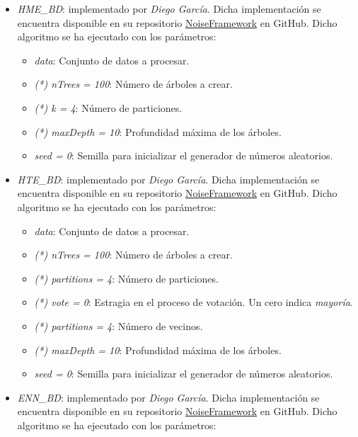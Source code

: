 \documentclass[11pt]{article}
\begin{document}
\begin{itemize}
	\item \textit{HME\_BD}: implementado por \textit{Diego García}. Dicha implementación se encuentra disponible en su repositorio \href{https://github.com/djgarcia/NoiseFramework}{NoiseFramework} en GitHub. Dicho algoritmo se ha ejecutado con los parámetros:
	
	\begin{itemize}
		\item \textit{data}: Conjunto de datos a procesar.
		\item \textit{(*) nTrees = 100}: Número de árboles a crear.
		\item \textit{(*) k = 4}: Número de particiones.
		\item \textit{(*) maxDepth = 10}: Profundidad máxima de los árboles.
		\item \textit{seed = 0}: Semilla para inicializar el generador de números aleatorios.
	\end{itemize}

	\item \textit{HTE\_BD}: implementado por \textit{Diego García}. Dicha implementación se encuentra disponible en su repositorio \href{https://github.com/djgarcia/NoiseFramework}{NoiseFramework} en GitHub. Dicho algoritmo se ha ejecutado con los parámetros:
	
	\begin{itemize}
		\item \textit{data}: Conjunto de datos a procesar.
		\item \textit{(*) nTrees = 100}: Número de árboles a crear.
		\item \textit{(*) partitions = 4}: Número de particiones.
		\item \textit{(*) vote = 0}: Estragia en el proceso de votación. Un cero indica \textit{mayoría}.
		\item \textit{(*) partitions = 4}: Número de vecinos.
		\item \textit{(*) maxDepth = 10}: Profundidad máxima de los árboles.
		\item \textit{seed = 0}: Semilla para inicializar el generador de números aleatorios.
	\end{itemize}
	
	\item \textit{ENN\_BD}: implementado por \textit{Diego García}. Dicha implementación se encuentra disponible en su repositorio \href{https://github.com/djgarcia/NoiseFramework}{NoiseFramework} en GitHub. Dicho algoritmo se ha ejecutado con los parámetros:
	

\end{itemize}
\end{document}
